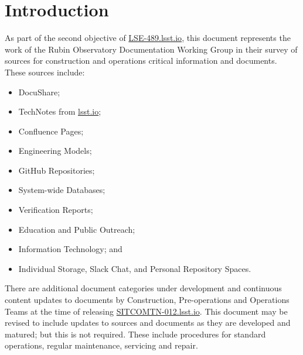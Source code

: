\section {Introduction}

As part of the second objective of \url{LSE-489.lsst.io}, this document represents the work of the Rubin Observatory Documentation Working Group in their survey of sources for construction and operations critical information and documents. These sources include:

\begin{itemize}
	\item DocuShare;
	\item TechNotes from \url{lsst.io};
	\item Confluence Pages;
	\item Engineering Models; 
	\item GitHub Repositories;
	\item System-wide Databases;
	\item Verification Reports;
	\item Education and Public Outreach; 
	\item Information Technology; and
	\item Individual Storage, Slack Chat, and Personal Repository Spaces.
\end{itemize}
	
There are additional document categories under development and continuous content updates to documents by Construction, Pre-operations and Operations Teams at the time of releasing \url{SITCOMTN-012.lsst.io}.
This document may be revised to include updates to sources and documents as they are developed and matured; but this is not required.
These include procedures for standard operations, regular maintenance, servicing and repair.
